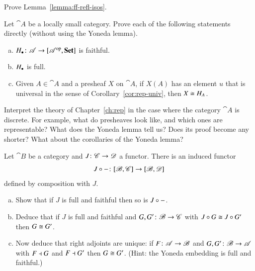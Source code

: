 \exs


\begin{question}
\label{ex:ff-refl-isos}
Prove Lemma~\ref{lemma:ff-refl-isos}.
\end{question}


\begin{question}
Let $\cat{A}$ be a locally small category.  Prove each of the following
statements directly (without using the Yoneda lemma).
%
\begin{enumerate}[(b)]
\item
$\h_\bl\from \cat{A} \to \pshf{\cat{A}}$ is faithful.

\item
$H_\bullet$ is full.

\item
Given $A \in \cat{A}$ and a presheaf $X$ on $\cat{A}$, if $X(A)$ has an
element $u$ that is universal in the sense of Corollary~\ref{cor:rep-univ},
then $X \cong H_A$.
\end{enumerate}
\end{question}


\begin{question}
Interpret the theory of Chapter~\ref{ch:rep} in the case where the category
$\cat{A}$ is discrete.  For example, what do presheaves look like, and
which ones are representable?  What does the Yoneda lemma tell us?  Does
its proof become any shorter?  What about the corollaries of the Yoneda
lemma?
\end{question}


\begin{question}
\label{ex:adjts-unique}
Let $\cat{B}$ be a category and $J\from \cat{C} \to \cat{D}$ a functor.
There is an induced functor
\[
J \of \dashbk\from \ftrcat{\cat{B}}{\cat{C}} \to \ftrcat{\cat{B}}{\cat{D}}
\]
defined by composition with $J$.
%
\begin{enumerate}[(b)]
\item
Show that if $J$ is full and faithful then so is $J\mathbin{\circ}-$.

\item
Deduce that if $J$ is full and faithful and $G, G'\from \cat{B} \to
\cat{C}$ with $J \mathbin{\circ} G \cong J \mathbin{\circ} G'$ then $G \cong G'$.

\item
Now deduce that right adjoints are unique:%
%
%
if $F\from \cat{A} \to \cat{B}$ and $G, G'\from \cat{B} \to \cat{A}$ with
$F \dashv G$ and $F \dashv G'$ then $G \cong G'$.  (Hint: the Yoneda embedding
is full and faithful.)
\end{enumerate}
\end{question}
